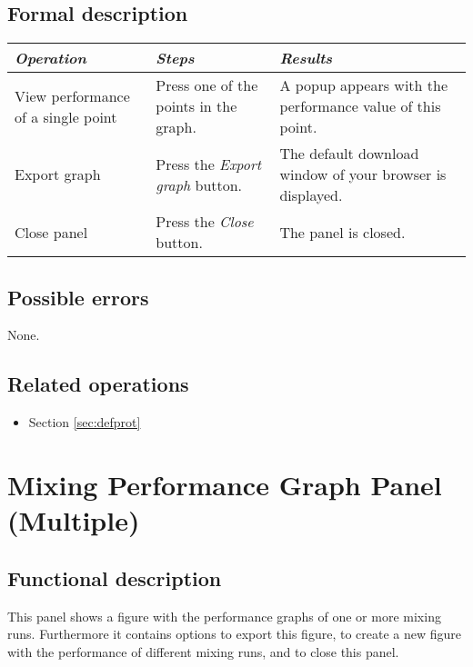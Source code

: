   \subsection*{Formal description}
    \begin{tabularx}{\textwidth}{XXX}
    \toprule
    \emph{Operation} & \emph{Steps} & \emph{Results} \\
    \midrule
    View performance of a single point & Press one of the points in the graph. & A popup appears with the performance value of this point. \\
    \midrule
    Export graph & Press the \emph{Export graph} button. & The default download window of your browser is displayed. \\
    \midrule
    Close panel & Press the \emph{Close} button. & The panel is closed. \\
    \bottomrule
\end{tabularx}

  \subsection*{Possible errors}
  None.

  \subsection*{Related operations}
   \begin{itemize}
   \item Section \ref{sec:defprot}
  \end{itemize}

\section{Mixing Performance Graph Panel (Multiple)}
\label{sec:mulperfgraph}
  \subsection*{Functional description}
  This panel shows a figure with the performance graphs of one or more mixing runs. Furthermore it contains options to export this figure, to create a new figure with the performance of different mixing runs, and to close this panel.

